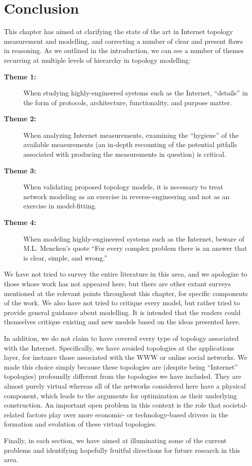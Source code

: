 \clearpage
\section{Conclusion}
\label{sec:conclusion}

This chapter has aimed at clarifying the state of the art in Internet
topology measurement and modelling, and correcting a number of clear
and present flaws in reasoning. As we outlined in the introduction, we
can see a number of themes recurring at multiple levels of hierarchy
in topology modelling: 

\begin{description}

\item[{\bf Theme 1:}] When studying highly-engineered systems such as
  the Internet, ``details'' in the form of protocols, architecture,
  functionality, and purpose matter.

\item[{\bf Theme 2:}] When analyzing Internet measurements, examining
  the ``hygiene'' of the available measurements (\ie an in-depth
  recounting of the potential pitfalls associated with producing the
  measurements in question) is critical.

\item[{\bf Theme 3:}] When validating proposed topology models, it is
  necessary to treat network modeling as an exercise in
  reverse-engineering and not as an exercise in model-fitting.

\item[{\bf Theme 4:}] When modeling highly-engineered systems such as
  the Internet, beware of M.L. Mencken's quote ``For every complex
  problem there is an answer that is clear, simple, and wrong.''

\end{description}

We have not tried to survey the entire literature in this area, and we
apologize to those whose work has not appeared here, but there are
other extant surveys mentioned at the relevant points throughout this
chapter, for specific components of the work. We also have not tried
to critique every model, but rather tried to provide general guidance
about modelling. It is intended that the readers could themselves
critique existing and new models based on the ideas presented here.

In addition, we do not claim to have covered every type of topology
associated with the Internet. Specifically, we have avoided topologies
at the applications layer, for instance those associated with the WWW
or online social networks.  We made this choice simply because these
topologies are (despite being ``Internet'' topologies) profoundly
different from the topologies we have included. They are almost purely
virtual whereas all of the networks considered here have a physical
component, which leads to the arguments for optimization as their
underlying construction.  An important open problem in this context is
the role that societal-related factors play over more economic- or
technology-based drivers in the formation and evolution of these
virtual topologies.

Finally, in each section, we have aimed at illuminating some of the
current problems and identifying hopefully fruitful directions for
future research in this area.
